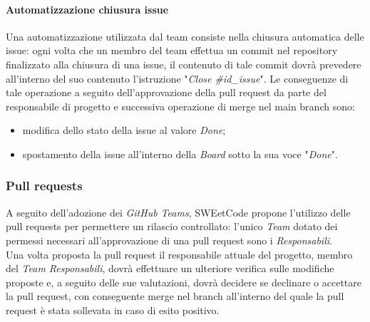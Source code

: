 \documentclass[10pt, a4paper]{article}
\begin{document}
\paragraph{Automatizzazione chiusura issue}Una automatizzazione utilizzata dal team consiste nella chiusura automatica delle issue: ogni volta che un membro del team effettua un commit nel repository finalizzato alla chiusura di una issue, il contenuto di tale commit dovrà prevedere all'interno del suo contenuto l'istruzione "\textit{Close \#id\_issue}".
Le conseguenze di tale operazione a seguito dell'approvazione della pull request da parte del responsabile di progetto e successiva operazione di merge nel main branch sono:
\begin{itemize}
    \item modifica dello stato della issue al valore \textit{Done};
    \item spostamento della issue all'interno della \textit{Board} sotto la sua voce "\textit{Done}".
\end{itemize}

\subsubsection{Pull requests} %
A seguito dell'adozione dei \textit{GitHub Teams}, SWEetCode propone l'utilizzo delle pull requests per permettere un rilascio controllato: l'unico \textit{Team} dotato dei permessi necessari all'approvazione di una pull request sono i \textit{Responsabili}.\\
Una volta proposta la pull request il responsabile attuale del progetto, membro del \textit{Team Responsabili}, dovrà effettuare un ulteriore verifica sulle modifiche proposte e, a seguito delle sue valutazioni, dovrà decidere se declinare o accettare la pull request, con conseguente merge nel branch all'interno del quale la pull request è stata sollevata in caso di esito positivo.
\end{document}

